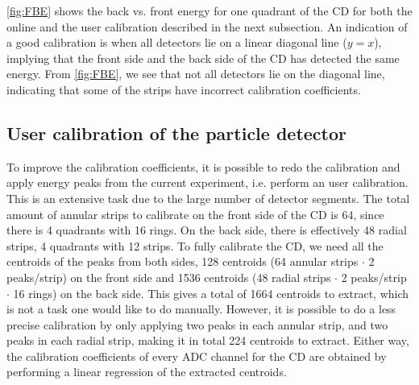 \documentclass[twoside,english]{uiofysmaster/uiofysmaster}
\newcommand{\Sm}{$^{140}$Sm} %
\newcommand{\Pb}{$^{208}$Pb}
\let\orgautoref\autoref
\renewcommand{\autoref}
        {%
		 \def\sectionautorefname{Section}%
		 \def\subsectionautorefname{Section}%
		 \def\subsubsectionautorefname{Section}%
		 \def\chapterautorefname{Chapter}%
          \orgautoref}
\begin{document}
\autoref{fig:FBE} shows the back vs. front energy for one quadrant of the CD for both the online and the user calibration described in the next subsection.
An indication of a good calibration is when all detectors lie on a linear diagonal line ($y = x$), implying that the front side and the back side of the CD has detected the same energy. 
From \autoref{fig:FBE}, we see that not all detectors lie on the diagonal line, indicating that some of the strips have incorrect calibration coefficients.



\subsection{User calibration of the particle detector}\label{ssec:user_cal}


To improve the calibration coefficients, it is possible to redo the calibration and apply energy peaks from the current experiment, i.e. perform an user calibration. 
This is an extensive task due to the large number of detector segments. 
The total amount of annular strips to calibrate on the front side of the CD is 64, since there is 4 quadrants with 16 rings. 
On the back side, there is effectively 48 radial strips, 4 quadrants with 12 strips.
To fully calibrate the CD, we need all the centroids of the peaks from both sides, 128 centroids (64 annular strips $\cdot$ 2 peaks/strip) on the front side and 1536 centroids (48 radial strips $\cdot$ 2 peaks/strip $\cdot$ 16 rings) on the back side. 
This gives a total of 1664 centroids to extract, which is not a task one would like to do manually.
However, it is possible to do a less precise calibration by only applying two peaks in each annular strip, and two peaks in each radial strip, making it in total 224 centroids to extract. 
Either way, the calibration coefficients of every ADC channel for the CD are obtained by performing a linear regression of the extracted centroids.
\end{document}
